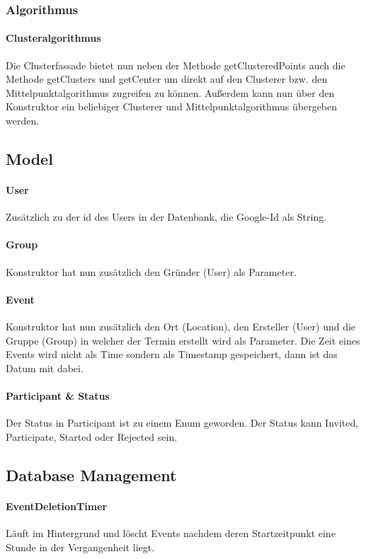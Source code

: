 \documentclass{scrartcl}
\begin{document}
	\subsubsection{Algorithmus}	
	\paragraph{Clusteralgorithmus}
	Die Clusterfassade bietet nun neben der Methode getClusteredPoints auch die Methode getClusters und getCenter um direkt auf den Clusterer bzw. den Mittelpunktalgorithmus zugreifen zu können. Außerdem kann nun über den Konstruktor ein beliebiger Clusterer und Mittelpunktalgorithmus übergeben werden.
	
	\subsection{Model}
	\paragraph{User}
	Zusätzlich zu der id des Users in der Datenbank, die Google-Id als String.
	\paragraph{Group}
	Konstruktor hat nun zusätzlich den Gründer (User) als Parameter.
		\paragraph{Event}
	Konstruktor hat nun zusätzlich den Ort (Location), den Ersteller (User) und die Gruppe (Group) in welcher der Termin erstellt wird als Parameter.
	Die Zeit eines Events wird nicht als Time sondern als Timestamp gespeichert, dann ist das Datum mit dabei.

	\paragraph{Participant \& Status}
	Der Status in Participant ist zu einem Enum geworden.
	Der Status kann Invited, Participate, Started oder Rejected sein.	
	\subsection{Database Management}
	\paragraph{EventDeletionTimer}
	Läuft im Hintergrund und löscht Events nachdem deren Startzeitpunkt eine Stunde in der Vergangenheit liegt.
\end{document}
